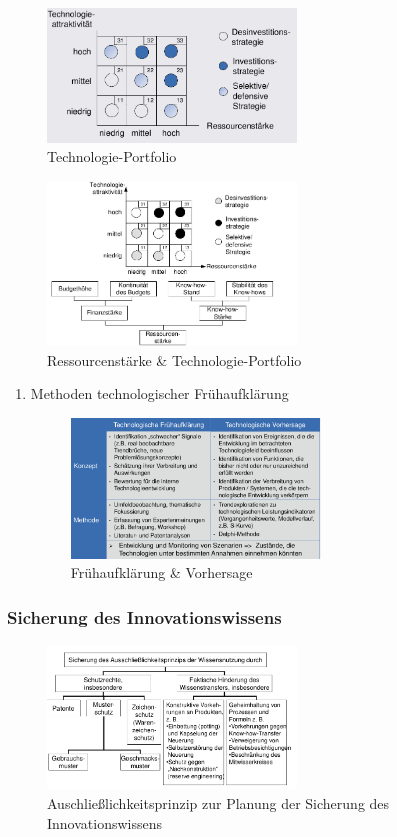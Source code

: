 \documentclass[11pt]{article}
\begin{document}
\begin{figure}[htbp]
\centering
\includegraphics[width=250px]{./pictures/intechpo.png}
\caption{Technologie-Portfolio}
\end{figure} 

\begin{figure}[htbp]
\centering
\includegraphics[width=250px]{./pictures/inrespo.png}
\caption{Ressourcenstärke \& Technologie-Portfolio}
\end{figure} 

\begin{enumerate}
\item Methoden technologischer Frühaufklärung
\label{sec:org2e826a9}
\begin{figure}[htbp]
\centering
\includegraphics[width=250px]{./pictures/invor.png}
\caption{Frühaufklärung \& Vorhersage}
\end{figure}
\end{enumerate}

\subsubsection{Sicherung des Innovationswissens}
\label{sec:orge4e9e02}
\begin{figure}[htbp]
\centering
\includegraphics[width=250px]{./pictures/inauss.png}
\caption{Auschließlichkeitsprinzip zur Planung der Sicherung des Innovationswissens}
\end{figure} 
\end{document}
